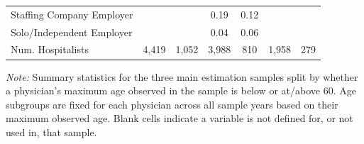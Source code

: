 \begin{table}[h]
\begin{tabular}[t]{lcccccc}
\hspace{1em}Staffing Company Employer &  &  & 0.19 & 0.12 &  & \\
\hspace{1em}Solo/Independent Employer &  &  & 0.04 & 0.06 &  & \\
Num. Hospitalists & 4,419 & 1,052 & 3,988 & 810 & 1,958 & 279\\
\bottomrule
\end{tabular}
\begin{tablenotes}
\footnotesize
\item \textit{Note: } Summary statistics for the three main estimation samples split by whether a physician's maximum age observed in the sample is below or at/above 60. Age subgroups are fixed for each physician across all sample years based on their maximum observed age. Blank cells indicate a variable is not defined for, or not used in, that sample.
\end{tablenotes}
\end{table}
